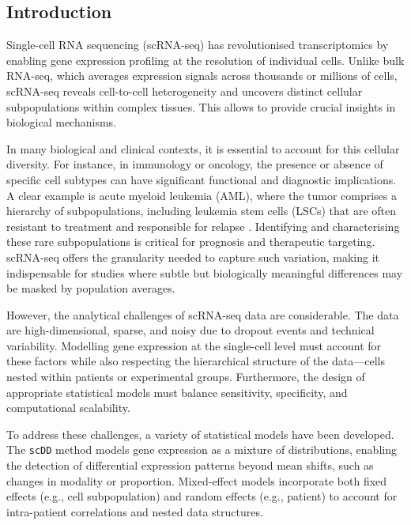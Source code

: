 \documentclass[a4paper, 11pt, twocolumn]{article}
\begin{document}
\begin{multicols}{2}
\section{Introduction}

Single-cell RNA sequencing (scRNA-seq) has revolutionised transcriptomics by enabling gene expression profiling at the resolution of individual cells. Unlike bulk RNA-seq, which averages expression signals across thousands or millions of cells, scRNA-seq reveals cell-to-cell heterogeneity and uncovers distinct cellular subpopulations within complex tissues. This allows to provide crucial insights in biological mechanisms.

In many biological and clinical contexts, it is essential to account for this cellular diversity. For instance, in immunology or oncology, the presence or absence of specific cell subtypes can have significant functional and diagnostic implications. A clear example is acute myeloid leukemia (AML), where the tumor comprises a hierarchy of subpopulations, including leukemia stem cells (LSCs) that are often resistant to treatment and responsible for relapse \citep{van2019single}. Identifying and characterising these rare subpopulations is critical for prognosis and therapeutic targeting. scRNA-seq offers the granularity needed to capture such variation, making it indispensable for studies where subtle but biologically meaningful differences may be masked by population averages.

However, the analytical challenges of scRNA-seq data are considerable. The data are high-dimensional, sparse, and noisy due to dropout events and technical variability. Modelling gene expression at the single-cell level must account for these factors while also respecting the hierarchical structure of the data—cells nested within patients or experimental groups. Furthermore, the design of appropriate statistical models must balance sensitivity, specificity, and computational scalability.

To address these challenges, a variety of statistical models have been developed. The \texttt{scDD} method \citep{scdd} models gene expression as a mixture of distributions, enabling the detection of differential expression patterns beyond mean shifts, such as changes in modality or proportion. Mixed-effect models  incorporate both fixed effects (e.g., cell subpopulation) and random effects (e.g., patient) to account for intra-patient correlations and nested data structures.


\end{multicols}
\end{document}
